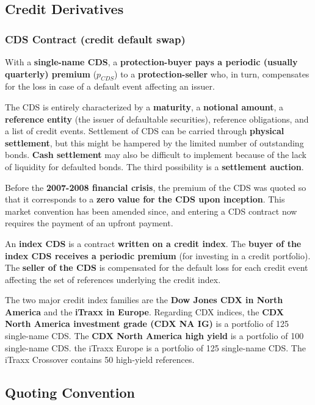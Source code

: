 \documentclass[12pt,a4paper]{article}
\begin{document}
\subsection{Credit Derivatives }
\subsubsection{CDS Contract (credit default swap) }

With a \textbf{single-name CDS}, a \textbf{protection-buyer pays a periodic (usually quarterly) premium} ($p_{CDS}$) to a \textbf{protection-seller} who, in turn, compensates for the loss in case of a default event affecting an issuer.

The CDS is entirely characterized by a \textbf{maturity}, a \textbf{notional amount}, a \textbf{reference entity} (the issuer of defaultable securities), reference obligations, and a list of credit events. Settlement of CDS can be carried through \textbf{physical settlement}, but this might be hampered by the limited number of outstanding bonds. \textbf{Cash settlement} may also be difficult to implement because of the lack of liquidity for defaulted bonds. The third possibility is a \textbf{settlement auction}.

Before the \textbf{2007-2008 financial crisis}, the premium of the CDS was quoted so that it corresponds to a \textbf{zero value for the CDS upon inception}. This market convention has been amended since, and entering a CDS contract now requires the payment of an upfront payment.


An \textbf{index CDS} is a contract \textbf{written on a credit index}. The \textbf{buyer of the index CDS receives a periodic premium} (for investing in a credit portfolio). The \textbf{seller of the CDS} is compensated for the default loss for each credit event affecting the set of references underlying the credit index.

The two major credit index families are the \textbf{Dow Jones CDX in North America} and the \textbf{iTraxx in Europe}. Regarding CDX indices, the \textbf{CDX North America investment grade (CDX NA IG)} is a portfolio of 125 single-name CDS. The \textbf{CDX North America high yield} is a portfolio of 100 single-name CDS. the iTraxx Europe is a portfolio of 125 single-name CDS. The iTraxx Crossover contains 50 high-yield references.

\subsection{Quoting Convention}
\end{document}
